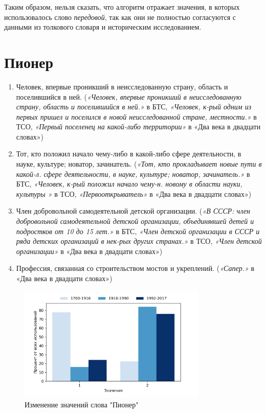 Таким образом, нельзя сказать, что алгоритм отражает значения, в которых использовалось
слово \textit{передовой}, так как они не полностью согласуются
с данными из толкового словаря и историческим исследованием.

\section*{Пионер}

\begin{enumerate}
    \item Человек, впервые проникший в неисследованную страну, область и поселившийся в ней.
(\textit{«Человек, впервые проникший в неисследованную страну, область и поселившийся в ней.»} в БТС,
\textit{«Человек, к-рый одним из первых пришел и поселился в новой неисследованной стране, местности.»} в ТСО,
\textit{«Первый поселенец на какой-либо территории»} в «Два века в двадцати словах»)

    \item Тот, кто положил начало чему-либо в какой-либо сфере деятельности, в науке, культуре; новатор, зачинатель.
(\textit{«Тот, кто прокладывает новые пути в какой-л. сфере деятельности, в науке, культуре; новатор, зачинатель.»} в БТС,
\textit{«Человек, к-рый положил начало чему-н. новому в области науки, культуры »} в ТСО,
\textit{«Первооткрыватель»} в «Два века в двадцати словах»)

    \item Член добровольной самодеятельной детской организации.
(\textit{«В СССР: член добровольной самодеятельной детской организации, объединявшей детей и подростков от 10 до 15 лет.»} в БТС,
\textit{«Член детской организации в СССР и ряда детских организаций в нек-рых других странах.»} в ТСО,
\textit{«Член детской организации»} в «Два века в двадцати словах»)

    \item Профессия, связанная со строительством мостов и укреплений.
(\textit{«Сапер.»} в «Два века в двадцати словах»)
\end{enumerate}

\begin{figure}[H]
	\centering
	\includegraphics[width=0.8\textwidth]{img/visualizations/pioner_minimal}
	\caption{Изменение значений слова "Пионер"}
	\label{fig:Пионер}
\end{figure}

